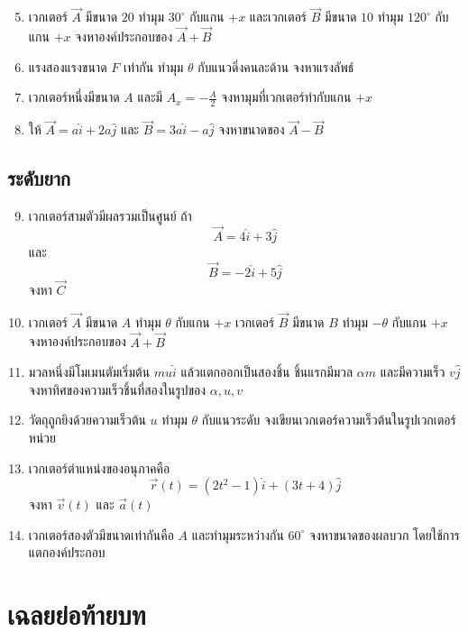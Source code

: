 \begin{enumerate}
    \setcounter{enumi}{4}
    \item เวกเตอร์ $\vec{A}$ มีขนาด $20$ ทำมุม $30^\circ$ กับแกน $+x$ และเวกเตอร์ $\vec{B}$ มีขนาด $10$ ทำมุม $120^\circ$ กับแกน $+x$ จงหาองค์ประกอบของ $\vec{A}+\vec{B}$
    \item แรงสองแรงขนาด $F$ เท่ากัน ทำมุม $\theta$ กับแนวดิ่งคนละด้าน จงหาแรงลัพธ์
    \item เวกเตอร์หนึ่งมีขนาด $A$ และมี $A_x=-\frac{A}{2}$ จงหามุมที่เวกเตอร์ทำกับแกน $+x$
    \item ให้ $\vec{A}=a\hat{i}+2a\hat{j}$ และ $\vec{B}=3a\hat{i}-a\hat{j}$ จงหาขนาดของ $\vec{A}-\vec{B}$
\end{enumerate}

\subsection*{ระดับยาก}

\begin{enumerate}
    \setcounter{enumi}{8}
    \item เวกเตอร์สามตัวมีผลรวมเป็นศูนย์ ถ้า
    \[
    \vec{A}=4\hat{i}+3\hat{j}
    \]
    และ
    \[
    \vec{B}=-2\hat{i}+5\hat{j}
    \]
    จงหา $\vec{C}$

    \item เวกเตอร์ $\vec{A}$ มีขนาด $A$ ทำมุม $\theta$ กับแกน $+x$ เวกเตอร์ $\vec{B}$ มีขนาด $B$ ทำมุม $-\theta$ กับแกน $+x$ จงหาองค์ประกอบของ $\vec{A}+\vec{B}$

    \item มวลหนึ่งมีโมเมนตัมเริ่มต้น $mu\hat{i}$ แล้วแตกออกเป็นสองชิ้น ชิ้นแรกมีมวล $\alpha m$ และมีความเร็ว $v\hat{j}$ จงหาทิศของความเร็วชิ้นที่สองในรูปของ $\alpha,u,v$

    \item วัตถุถูกยิงด้วยความเร็วต้น $u$ ทำมุม $\theta$ กับแนวระดับ จงเขียนเวกเตอร์ความเร็วต้นในรูปเวกเตอร์หน่วย

    \item เวกเตอร์ตำแหน่งของอนุภาคคือ
    \[
    \vec{r}(t)=(2t^2-1)\hat{i}+(3t+4)\hat{j}
    \]
    จงหา $\vec{v}(t)$ และ $\vec{a}(t)$

    \item เวกเตอร์สองตัวมีขนาดเท่ากันคือ $A$ และทำมุมระหว่างกัน $60^\circ$ จงหาขนาดของผลบวก โดยใช้การแตกองค์ประกอบ
\end{enumerate}

\section{เฉลยย่อท้ายบท}

